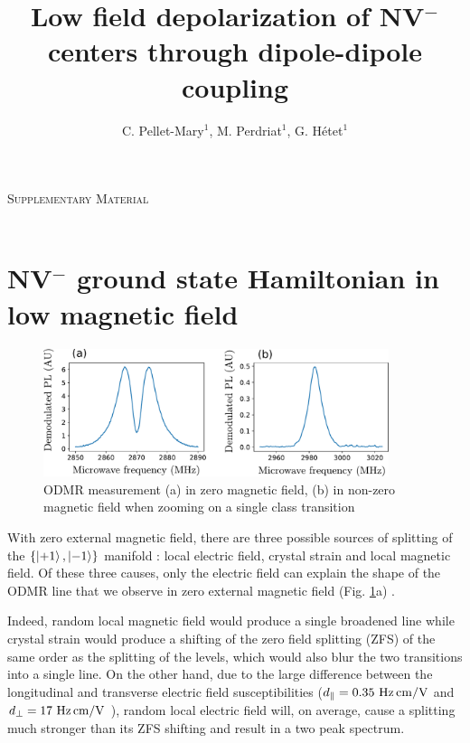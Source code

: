 \documentclass[preprintnumbers,amsmath,amssymb,onecolumn,12pt]{revtex4-2}
\begin{document}
\vspace{0.2in}
{\Large \hspace{1.6in}\textsc{Supplementary Material} }\\
\
\title{Low field depolarization of NV$^-$ centers through dipole-dipole coupling}

\author{C. Pellet-Mary$^1$, M. Perdriat$^1$, G. H\'etet$^1$} 


\maketitle

\tableofcontents

\section{NV$^-$ ground state Hamiltonian in low magnetic field}
\label{sec Hamiltonian}
\begin{figure}
\includegraphics[width=0.9\textwidth]{Figures_SI/fig_ESR}
\caption{ODMR measurement (a) in zero magnetic field, (b) in non-zero magnetic field when zooming on a single class transition}
\label{ESR_single_spin}
\end{figure}
With zero external magnetic field, there are three possible sources of splitting of the $\{\ket{+1},\ket{-1}\}$ manifold : local electric field, crystal strain and local magnetic field. Of these three causes, only the electric field can explain the shape of the ODMR line that we observe in zero external magnetic field (Fig. \ref{ESR_single_spin}a) \cite{mittiga2018imaging}.

Indeed, random local magnetic field would produce a single broadened line while crystal strain would produce a shifting of the zero field splitting (ZFS) of the same order as the splitting of the levels, which would also blur the two transitions into a single line. On the other hand, due to the large difference between the longitudinal and transverse electric field susceptibilities ($d_\parallel = 0.35\ \rm Hz\, cm/V$ and $d_\perp = 17\ \rm Hz\, cm/V$ \cite{van1990electric}), random local electric field will, on average, cause a splitting much stronger than its ZFS shifting and result in a two peak spectrum.
\end{document}
